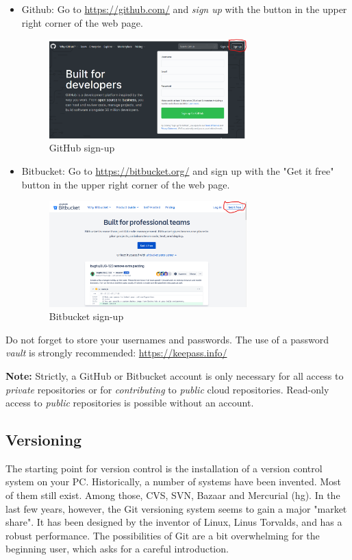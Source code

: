 \begin{itemize}
	\item Github: Go to \url{https://github.com/} and \emph{sign up} with the button in the upper right corner of the web page.
	\begin{figure}[H]
		\centering
		\includegraphics[width=3.0in]{Figures/GitHub_signup.png}
		\caption{GitHub sign-up}
		\label{GitHubSignup}
	\end{figure} 
	\item Bitbucket: Go to \url{https://bitbucket.org/} and sign up with the "Get it free" button in the upper right corner of the web page.
	\begin{figure}[H]
		\centering
		\includegraphics[width=3.0in]{Figures/Bitbucket_signup.png}
		\caption{Bitbucket sign-up}
		\label{BitbucketSignup}
	\end{figure}
\end{itemize}

Do not forget to store your usernames and passwords. The use of a password \textit{vault} is strongly recommended: \url{https://keepass.info/}

\textbf{Note:} Strictly, a GitHub or Bitbucket account is only necessary for all access to \emph{private} repositories or for \emph{contributing} to \emph{public} cloud repositories. Read-only access to \emph{public} repositories is possible without an account.

\subsection{Versioning}
\label{appendix:versioning}

The starting point for version control is the installation of a version control system on your PC. Historically, a number of systems have been invented. Most of them still exist. Among those, CVS, SVN, Bazaar and Mercurial (hg). In the last few years, however, the Git versioning system seems to gain a major "market share". It has been designed by the inventor of Linux, Linus Torvalds, and has a robust performance. The possibilities of Git are a bit overwhelming for the beginning user, which asks for a careful introduction.

